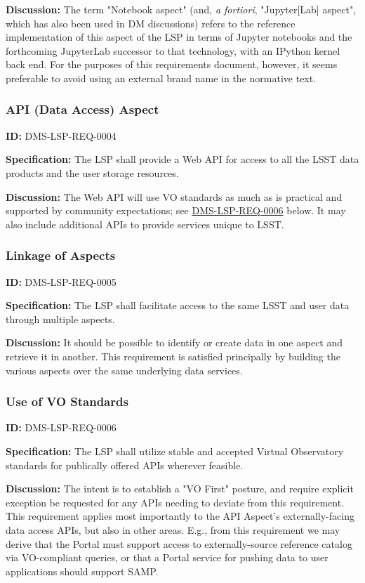 \documentclass[SE,toc]{lsstdoc}
\begin{document}
\textbf{Discussion:}
The term "Notebook aspect" (and, \textit{a fortiori}, "Jupyter[Lab] aspect", which has also been used in DM discussions) refers to the reference implementation of this aspect of the LSP in terms of Jupyter notebooks and the forthcoming JupyterLab successor to that technology, with an IPython kernel back end. For the purposes of this requirements document, however, it seems preferable to avoid using an external brand name in the normative text.

\subsubsection{API (Data Access) Aspect}

\label{DMS-LSP-REQ-0004}
\textbf{ID:} DMS-LSP-REQ-0004

\textbf{Specification:}
The LSP shall provide a Web API for access to all the LSST data products and the user storage resources.

\textbf{Discussion:}
The Web API will use VO standards as much as is practical and supported by community expectations; see \hyperref[DMS-LSP-REQ-0006]{DMS-LSP-REQ-0006} below.  It may also include additional APIs to provide services unique to LSST.

\subsubsection{Linkage of Aspects}

\label{DMS-LSP-REQ-0005}
\textbf{ID:} DMS-LSP-REQ-0005

\textbf{Specification:}
The LSP shall facilitate access to the same LSST and user data through multiple aspects.

\textbf{Discussion:}
It should be possible to identify or create data in one aspect and retrieve it in another.  This requirement is satisfied principally by building the various aspects over the same underlying data services.

\subsubsection{Use of VO Standards}

\label{DMS-LSP-REQ-0006}
\textbf{ID:} DMS-LSP-REQ-0006

\textbf{Specification:}
The LSP shall utilize stable and accepted Virtual Observatory standards for publically offered APIs wherever feasible.

\textbf{Discussion:}
The intent is to establish a "VO First" posture, and require explicit exception be requested for any APIs needing to deviate from this requirement.
This requirement applies most importantly to the API Aspect's externally-facing data access APIs, but also in other areas.
E.g., from this requirement we may derive that the Portal must support access to externally-source reference catalog via VO-compliant queries, or that a Portal service for pushing data to user applications should support SAMP.
\end{document}

